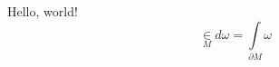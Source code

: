 \documentclass[a4paper, 12pt]{article}
\begin{document}
    Hello, world!
    $$
        \in\limits_M d\omega = \int\limits_{\partial M} \omega
    $$
\end{document}

